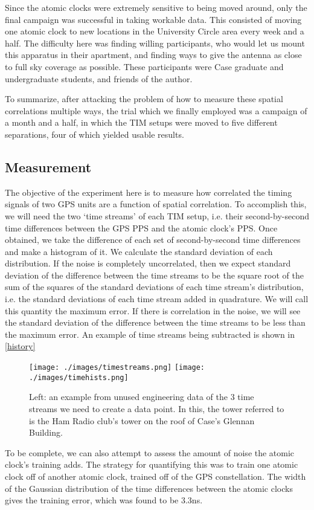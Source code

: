 Since the atomic clocks were extremely sensitive to being moved around, only the final campaign was successful in taking workable data. This consisted of moving one atomic clock to new locations in the University Circle area every week and a half. The difficulty here was finding willing participants, who would let us mount this apparatus in their apartment, and finding ways to give the antenna as close to full sky coverage as possible. These participants were Case graduate and undergraduate students, and friends of the author. 

To summarize, after attacking the problem of how to measure these spatial correlations multiple ways, the trial which we finally employed was a campaign of a month and a half, in which the TIM setups were moved to five different separations, four of which yielded usable results.
\subsection{Measurement}
The objective of the experiment here is to measure how correlated the timing signals of two GPS units are a function of spatial correlation. To accomplish this, we will need the two `time streams' of each TIM setup, i.e. their second-by-second time differences between the GPS PPS and the atomic clock's PPS. Once obtained, we take the difference of each set of second-by-second time differences and make a histogram of it. We calculate the standard deviation of each distribution. If the noise is completely uncorrelated, then we expect standard deviation of the difference between the time streams to be the square root of the sum of the squares of the standard deviations of each time stream's distribution, i.e. the standard deviations of each time stream added in quadrature. We will call this quantity the maximum error. If there is correlation in the noise, we will see the standard deviation of the difference between the time streams to be less than the maximum error. An example of time streams being subtracted is shown in \autoref{history}
\begin{figure}[h!]
\centering
\texttt{[image: ./images/timestreams.png]}
\texttt{[image: ./images/timehists.png]}
\caption[Time Streams Example]{Left: an example from unused engineering data of the 3 time streams we need to create a data point. In this, the tower referred to is the Ham Radio club's tower on the roof of Case's Glennan Building.}
\label{timemeas}
\end{figure}
To be complete, we can also attempt to assess the amount of noise the atomic clock's training adds. The strategy for quantifying this was to train one atomic clock off of another atomic clock, trained off of the GPS constellation. The width of the Gaussian distribution of the time differences between the atomic clocks gives the training error, which was found to be 3.3ns. 

